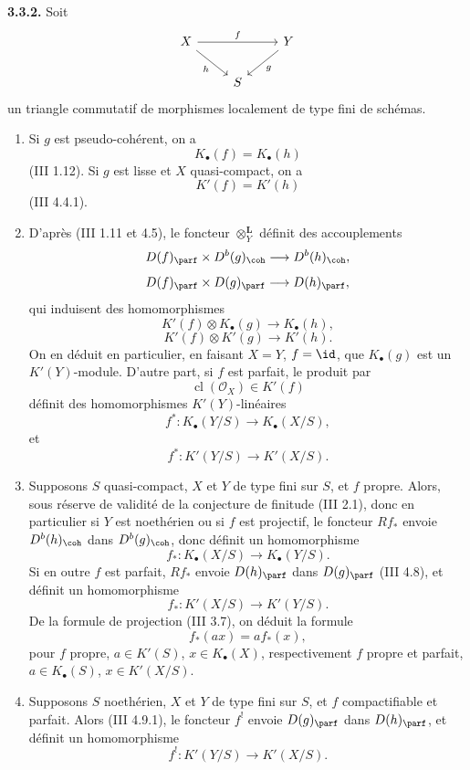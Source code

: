 \documentclass[11pt]{article}
\newcommand{\cl}{\operatorname{cl}}
\begin{document}
\textbf{3.3.2.} Soit
\[
\begin{tikzcd}
X\arrow[rr,"f"]\arrow[dr,"h"'] &&Y\arrow[dl,"g"]\\
&S&
\end{tikzcd}
\]
un triangle commutatif de morphismes localement de type fini de schémas.
\begin{enumerate}[label=\textbf{3.3.2.\arabic*.}, leftmargin=4em]
\item Si \(g\) est pseudo-cohérent, on a
\[
 K_{\bullet}(f)=K_{\bullet}(h)
\]
(III 1.12). Si \(g\) est lisse et \(X\) quasi-compact, on a
\[
 K'(f)=K'(h)
\]
(III 4.4.1).

\item D'après (III 1.11 et 4.5), le foncteur \(\otimes_Y^{\mathbf L}\) définit des accouplements
\[
 D(f)_{\parf}\times D^b(g)_{\coh}\longrightarrow D^b(h)_{\coh},
\]
\[
 D(f)_{\parf}\times D(g)_{\parf}\longrightarrow D(h)_{\parf},
\]
qui induisent des homomorphismes
\[
 K'(f)\otimes K_{\bullet}(g)\longrightarrow K_{\bullet}(h),
\]
\[
 K'(f)\otimes K'(g)\longrightarrow K'(h).
\]
On en déduit en particulier, en faisant \(X=Y\), \(f=\id\), que \(K_{\bullet}(g)\) est un \(K'(Y)\)-module. D'autre part, si \(f\) est parfait, le produit par
\[
 \cl(\mathcal O_X)\in K'(f)
\]
définit des homomorphismes \(K'(Y)\)-linéaires
\[
 f^*:K_{\bullet}(Y/S)\longrightarrow K_{\bullet}(X/S),
\]
et
\[
 f^*:K'(Y/S)\longrightarrow K'(X/S).
\]

\item Supposons \(S\) quasi-compact, \(X\) et \(Y\) de type fini sur \(S\), et \(f\) propre. Alors, sous réserve de validité de la conjecture de finitude (III 2.1), donc en particulier si \(Y\) est noethérien ou si \(f\) est projectif, le foncteur \(Rf_*\) envoie \(D^b(h)_{\coh}\) dans \(D^b(g)_{\coh}\), donc définit un homomorphisme
\[
 f_*:K_{\bullet}(X/S)\longrightarrow K_{\bullet}(Y/S).
\]
Si en outre \(f\) est parfait, \(Rf_*\) envoie \(D(h)_{\parf}\) dans \(D(g)_{\parf}\) (III 4.8), et définit un homomorphisme
\[
 f_*:K'(X/S)\longrightarrow K'(Y/S).
\]
De la formule de projection (III 3.7), on déduit la formule
\[
 f_*(a x)=a f_*(x),
\]
pour \(f\) propre, \(a\in K'(S)\), \(x\in K_{\bullet}(X)\), respectivement \(f\) propre et parfait, \(a\in K_{\bullet}(S)\), \(x\in K'(X/S)\).

\item Supposons \(S\) noethérien, \(X\) et \(Y\) de type fini sur \(S\), et \(f\) compactifiable et parfait. Alors (III 4.9.1), le foncteur \(f^!\) envoie \(D(g)_{\parf}\) dans \(D(h)_{\parf}\), et définit un homomorphisme
\[
 f^!:K'(Y/S)\longrightarrow K'(X/S).
\]
\end{enumerate}
\end{document}
